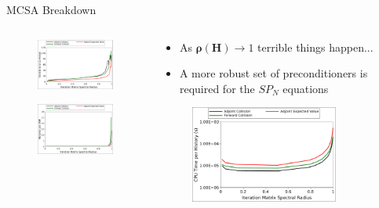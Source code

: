 \documentclass{beamer}
\begin{document}
\begin{frame}{MCSA Breakdown}

  \begin{columns}

    \begin{column}{0.5\textwidth}

      \begin{figure}[h!]
        \begin{center}
          \includegraphics[width=1.9in]{breakdown_iterations.pdf}
        \end{center}
      \end{figure}

      \begin{figure}[h!]
        \begin{center}
          \includegraphics[width=1.9in]{breakdown_histories.pdf}
        \end{center}
      \end{figure}

    \end{column}

    \begin{column}{0.5\textwidth}

    \begin{itemize}
    \item As $\mathbf{\rho}(\mathbf{H}) \rightarrow 1$ terrible things
      happen...
      \medskip
    \item A more robust set of preconditioners is required for the
      $SP_N$ equations
    \end{itemize}

      \begin{figure}[h!]
        \begin{center}
          \includegraphics[width=1.9in]{breakdown_time.pdf}
        \end{center}
      \end{figure}


\end{column}
\end{columns}
\end{frame}
\end{document}
